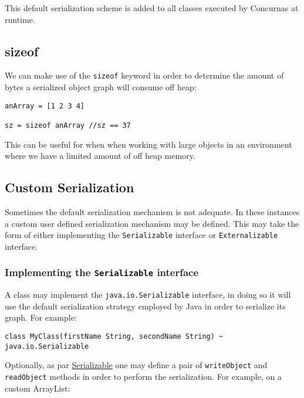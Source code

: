 \documentclass[conc-doc]{subfiles}
\begin{document}
This default serialization scheme is added to all classes executed by Concurnas at runtime.

\subsection{sizeof}
We can make use of the \lstinline{sizeof} keyword in order to determine the amount of bytes a serialized object graph will consume off heap:

\begin{lstlisting}
anArray = [1 2 3 4]

sz = sizeof anArray //sz == 37
\end{lstlisting}

This can be useful for when when working with large objects in an environment where we have a limited amount of off heap memory.

\subsection{Custom Serialization}
Sometimes the default serialization mechanism is not adequate. In these instances a custom user defined serialization mechanism may be defined. This may take the form of either implementing the \lstinline{Serializable} interface or \lstinline{Externalizable} interface.


\subsubsection{Implementing the \lstinline{Serializable} interface}
A class may implement the \lstinline{java.io.Serializable} interface, in doing so it will use the default serialization strategy employed by Java in order to serialize its graph. For example:

\begin{lstlisting}
class MyClass(firstName String, secondName String) ~ java.io.Serializable
\end{lstlisting}

Optionally, as par \href{https://docs.oracle.com/javase/9/docs/api/java/io/Serializable.html}{Serializable} one may define a pair of \lstinline{writeObject} and \lstinline{readObject} methods in order to perform the serialization. For example, on a custom ArrayList:
\end{document}
